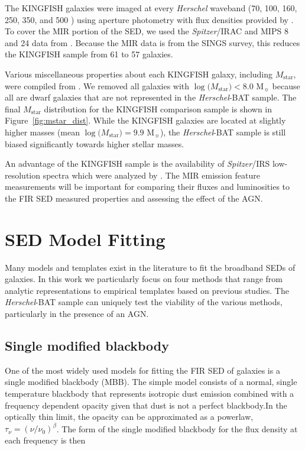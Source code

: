 \documentclass[fleqn, usenatbib]{mnras}
\newcommand{\herschel}{\emph{Herschel}}
\newcommand{\msun}{M$_{\sun}$}
\newcommand{\mstar}{$M_{\mathrm{star}}$}
\begin{document}
The KINGFISH galaxies were imaged at every \herschel{} waveband (70, 100, 160, 250, 350, and 500 \micron) using aperture photometry with flux densities provided by \citet{Dale:2012dq}. To cover the MIR portion of the SED, we used the \textit{Spitzer}/IRAC and MIPS 8 and 24 \micron{} data from \citet{Dale:2007fk}. Because the MIR data is from the SINGS survey, this reduces the KINGFISH sample from 61 to 57 galaxies. 

Various miscellaneous properties about each KINGFISH galaxy, including \mstar, were compiled from \citet{Kennicutt:2011vn}. We removed all galaxies with $\log($\mstar$)<8.0$ \msun{} because all are dwarf galaxies that are not represented in the \herschel-BAT sample. The final \mstar{} distribution for the KINGFISH comparison sample is shown in Figure~\ref{fig:mstar_dist}. While the KINGFISH galaxies are located at slightly higher masses (mean $\log($\mstar$)=9.9$ \msun), the \herschel-BAT sample is still biased significantly towards higher stellar masses. 

An advantage of the KINGFISH sample is the availability of \textit{Spitzer}/IRS low-resolution spectra which were analyzed by \citet{Smith:2007lr}. The MIR emission feature measurements will be important for comparing their fluxes and luminosities to the FIR SED measured properties and assessing the effect of the AGN. 

\section{SED Model Fitting}
Many models and templates exist in the literature to fit the broadband SEDs of galaxies. In this work we particularly focus on four methods that range from analytic representations to empirical templates based on previous studies. The \herschel-BAT sample can uniquely test the viability of the various methods, particularly in the presence of an AGN. 

\subsection{Single modified blackbody}
One of the most widely used models for fitting the FIR SED of galaxies is a single modified blackbody (MBB). The simple model consists of a normal, single temperature blackbody that represents isotropic dust emission combined with a frequency dependent opacity given that dust is not a perfect blackbody.In the optically thin limit, the opacity can be approximated as a powerlaw, $\tau_{\nu}=(\nu/\nu_{0})^{\beta}$. The form of the single modified blackbody for the flux density at each frequency is then
\end{document}
